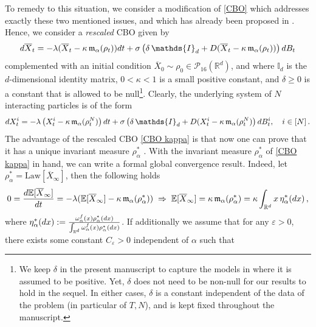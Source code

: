 \documentclass[12pt]{amsart}
\newcommand{\dt}{{\rm d} t}
\newcommand{\dx}{{\rm d} x}
\newcommand{\rd}{{\rm d} }
\newcommand{\RR}{{\mathbb R}}
\newcommand{\EE}{{\mathbb E}}
\newcommand{\OX}{{\overline{X}}}
\numberwithin{equation}{section}
\begin{document}
To remedy to this situation, we consider a modification of \eqref{CBO} which addresses exactly these two mentioned issues, and which has already been proposed in \cite{huang2024self, herty2024multiscale}. Hence, we consider a \textit{rescaled} CBO given by
\begin{equation}\label{CBO kappa}
    \rd \OX_t =-\lambda(\OX_t - \kappa\,\mathfrak{m}_{\alpha}(\rho_t))\dt+\sigma\left(\delta\,\mathds{I}_{d} + D(\OX_t - \kappa\, \mathfrak{m}_{\alpha}(\rho_t)) \right)\rd B_t
\end{equation}
complemented with an initial condition $\OX_{0}\sim \rho_0\in\mathscr{P}_{16}(\RR^d)$, and where $\mathds{I}_{d}$ is the $d$-dimensional identity matrix, $0<\kappa<1$ is a small positive constant, and $\delta\geq 0$ is a constant that is allowed to be null\footnote{We keep $\delta$ in the present manuscript to capture the models in \cite{huang2024self, herty2024multiscale} where it is assumed to be positive. Yet, $\delta$ does not need to be non-null for our results to hold in the sequel. In either cases, $\delta$ is a constant  independent of the data of the problem (in particular of $T,N$), and is kept fixed throughout the manuscript.}. 
Clearly, the  underlying system of $N$ interacting particles is of the form
 \begin{equation}\label{CBOkappa particle}
\rd X_t^i =-\lambda \left(X_t^i - \kappa\,\mathfrak{m}_{\alpha}(\rho_t^N) \right) \dt+\sigma\left(\delta\,\mathds{I}_{d} + D(X_t^i - \kappa\, \mathfrak{m}_{\alpha}(\rho_t^N) \right)\rd B_t^i,\quad i\in [N]\,.
\end{equation}
The advantage of the  rescaled CBO \eqref{CBO kappa} is that now one can prove that it has a unique invariant measure $\rho_\alpha^*$ \cite[Proposition 3.4]{huang2024self}. With the invariant measure $\rho_\alpha^*$ of \eqref{CBO kappa} in hand, we can write a formal global convergence result. Indeed, let 
$\rho_\alpha^*=\text{Law}[\OX_\infty]$, then the following holds
\begin{equation}
	\label{eq:formal conv}
	0=\frac{\rd \EE[\OX_\infty]}{\dt}=-\lambda (\EE[\OX_\infty]-\kappa\,\mathfrak{m}_{\alpha}(\rho_\alpha^*)) \; \Rightarrow \;  \EE[\OX_\infty] %
	= \kappa \,\mathfrak{m}_{\alpha}(\rho_\alpha^*)=\kappa\int_{ \RR^d }x\,\eta_\alpha^*(\dx)\,,
\end{equation}
where $\eta_\alpha^*(\dx):=\frac{\omega_\alpha^f(x)\rho_\alpha^*(\dx)}{\int_{ \RR^d }\omega_\alpha^f(x)\rho_\alpha^*(\dx)}$.
If additionally we assume that for any $\varepsilon>0$, there exists some constant $C_\varepsilon>0$ independent of $\alpha$ such that 
\end{document}
